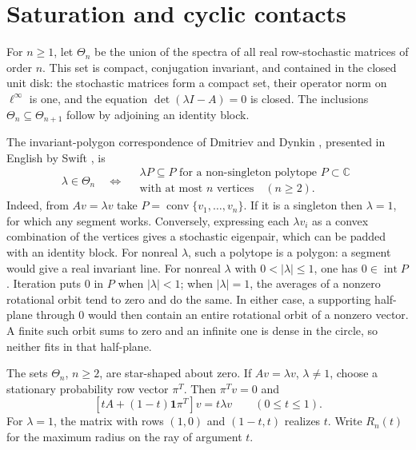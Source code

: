 \documentclass[11pt,a4paper]{article}
\newcommand{\C}{\mathbb C}
\DeclareMathOperator{\conv}{conv}
\theoremstyle{definition}
\theoremstyle{remark}
\numberwithin{equation}{section}
\begin{document}
\section{Saturation and cyclic contacts}
For $n\ge1$, let $\Theta_n$ be the union of the spectra of all real row-stochastic matrices of order $n$. This set is compact, conjugation invariant, and contained in the closed unit disk: the stochastic matrices form a compact set, their operator norm on $\ell^\infty$ is one, and the equation $\det(\lambda I-A)=0$ is closed. The inclusions $\Theta_n\subseteq\Theta_{n+1}$ follow by adjoining an identity block.

The invariant-polygon correspondence of Dmitriev and Dynkin \cite[\S\S1--2]{DD}, presented in English by Swift \cite{Swift}, is
\begin{equation}\label{eq:polygon-criterion}
 \lambda\in\Theta_n\quad\Longleftrightarrow\quad
 \begin{gathered}
 \lambda P\subseteq P\text{ for a non-singleton polytope }P\subset\C\\
 \text{with at most }n\text{ vertices}\quad(n\ge2).
 \end{gathered}
\end{equation}
Indeed, from $Av=\lambda v$ take $P=\conv\{v_1,\ldots,v_n\}$. If it is a singleton then $\lambda=1$, for which any segment works. Conversely, expressing each $\lambda v_i$ as a convex combination of the vertices gives a stochastic eigenpair, which can be padded with an identity block.
For nonreal $\lambda$, such a polytope is a polygon: a segment would give a real invariant line. For nonreal $\lambda$ with $0<|\lambda|\le1$, one has $0\in\operatorname{int}P$. Iteration puts $0$ in $P$ when $|\lambda|<1$; when $|\lambda|=1$, the averages of a nonzero rotational orbit tend to zero and do the same. In either case, a supporting half-plane through $0$ would then contain an entire rotational orbit of a nonzero vector. A finite such orbit sums to zero and an infinite one is dense in the circle, so neither fits in that half-plane.

The sets $\Theta_n$, $n\ge2$, are star-shaped about zero. If $Av=\lambda v$, $\lambda\ne1$, choose a stationary probability row vector $\pi^T$. Then $\pi^Tv=0$ and
\[
 [tA+(1-t)\mathbf1\pi^T]v=t\lambda v\qquad(0\le t\le1).
\]
For $\lambda=1$, the matrix with rows $(1,0)$ and $(1-t,t)$ realizes $t$. Write $R_n(t)$ for the maximum radius on the ray of argument $t$.
\end{document}
